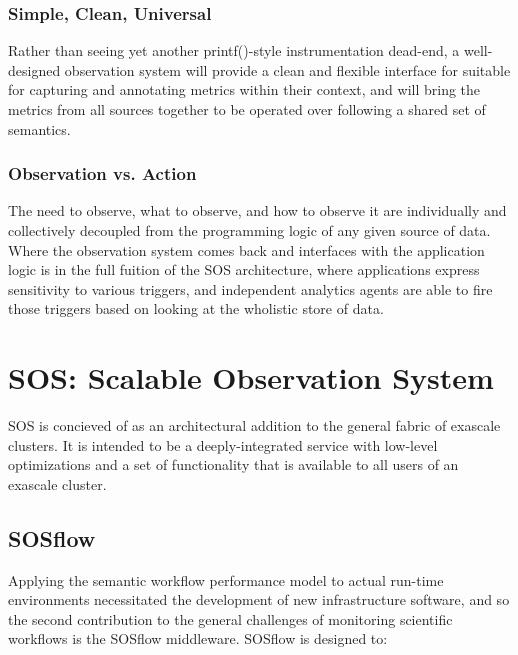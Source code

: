 \subsubsection{Simple, Clean, Universal}
Rather than seeing yet another printf()-style instrumentation
dead-end, a well-designed observation system will provide a clean and
flexible interface for suitable for capturing and annotating metrics
within their context, and will bring the metrics from all sources
together to be operated over following a shared set of semantics.

\subsubsection{Observation vs. Action}
The need to observe, what to observe, and how to observe it are
individually and collectively decoupled from the programming logic of
any given source of data. Where the observation system comes back and
interfaces with the application logic is in the full fuition of the
SOS architecture, where applications express sensitivity to various
triggers, and independent analytics agents are able to fire those triggers
based on looking at the wholistic store of data.



\section{SOS: Scalable Observation System}

SOS is concieved of as an architectural addition to the general fabric of
exascale clusters. It is intended to be a deeply-integrated service with low-level
optimizations and a set of functionality that is available to all users of an exascale
cluster.


\subsection{SOSflow}
Applying the semantic workflow performance model to actual
run-time environments necessitated the development of new
infrastructure software, and so the second contribution to the general
challenges of monitoring scientific workflows is the SOSflow middleware.
SOSflow is designed to:

